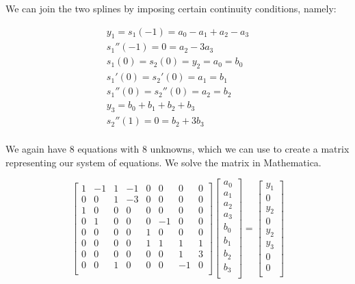 \documentclass[a4paper,12pt]{article}
\begin{document}
We can join the two splines by imposing certain continuity conditions, namely:

\begin{eqnarray*}
y_1=s_1(-1)=a_0-a_1+a_2-a_3 \\
s_1''(-1)=0=a_2-3a_3 \\
s_1(0)=s_2(0)=y_2=a_0=b_0 \\
s_1'(0)=s_2'(0)=a_1=b_1 \\
s_1''(0)=s_2''(0)=a_2=b_2 \\
y_3=b_0+b_1+b_2+b_3 \\ 
s_2''(1)=0=b_2+3b_3 \\ 
\end{eqnarray*}

We again have 8 equations with 8 unknowns, which we can use to create a matrix representing our system of equations. We solve the matrix in Mathematica. 

\begin{equation*}
 \begin{bmatrix}
	1 & -1 & 1 & -1 & 0 & 0 & 0 & 0           \\[0.2em]
	0 & 0 & 1 & -3 & 0 & 0 & 0 & 0           \\[0.2em]
	1 & 0 & 0 & 0 & 0 & 0 & 0 & 0           \\[0.2em]
	0 & 1 & 0 & 0 & 0 & -1 & 0 & 0           \\[0.2em]
	0 & 0 & 0 & 0 & 1 & 0 & 0 & 0           \\[0.2em]
	0 & 0 & 0 & 0 & 1 & 1 & 1 & 1           \\[0.2em]
	0 & 0 & 0 & 0 & 0 & 0 & 1 & 3           \\[0.2em]
	0 & 0 & 1 & 0 & 0 & 0 & -1 & 0           \\[0.2em]
     \end{bmatrix}
 \begin{bmatrix}
	a_0           \\[0.2em]
	a_1          \\[0.2em]
	a_2          \\[0.2em]
	a_3           \\[0.2em]
	b_0           \\[0.2em]
	b_1          \\[0.2em]
	b_2          \\[0.2em]
	b_3           \\[0.2em]
     \end{bmatrix}
=
 \begin{bmatrix}
	y_1           \\[0.2em]
	0          \\[0.2em]
	y_2          \\[0.2em]
	0           \\[0.2em]
	y_2           \\[0.2em]
	y_3         \\[0.2em]
	0          \\[0.2em]
	0           \\[0.2em]
     \end{bmatrix}
\end{equation*}
\end{document}

